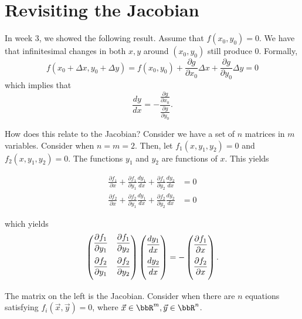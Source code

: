 \documentclass[a4paper, 12pt,oneside,openany]{book}
\begin{document}
\section{Revisiting the Jacobian}

In week 3, we showed the following result. Assume that $f(x_0, y_0)=0$. We have that infinitesimal changes in both $x, y$ around $(x_0, y_0)$ still produce 0. Formally, $$f(x_0 + \Delta x, y_0+\Delta y) = f(x_0, y_0) + \frac{\partial g}{\partial x_0} \Delta x + \frac{\partial g}{\partial y_0} \Delta y = 0$$ which implies that $$\frac{dy}{dx}= -\frac{\frac{\partial g}{\partial x_0}}{\frac{\partial g}{\partial y_0}}.$$

How does this relate to the Jacobian? Consider we have a set of $n$ matrices in $m$ variables. Consider when $n=m=2$. Then, let $f_1(x, y_1, y_2)=0$ and $f_2(x, y_1, y_2)=0$. The functions $y_1$ and $y_2$ are functions of $x$. This yields 

\begin{align*}
	\frac{\partial f_1}{\partial x}+ \frac{\partial f_1}{\partial y_1} \frac{dy_1}{dx}+ \frac{\partial f_1}{\partial y_2} \frac{dy_2}{dx}&=0\\
	\frac{\partial f_2}{\partial x}+ \frac{\partial f_2}{\partial y_1} \frac{dy_1}{dx}+ \frac{\partial f_2}{\partial y_2} \frac{dy_2}{dx}&=0
\end{align*}

which yields $$\begin{pmatrix} \medskip \dfrac{\partial f_1}{\partial y_1} & \dfrac{\partial f_1}{\partial y_2} \\ \medskip \dfrac{\partial f_2}{\partial y_1} & \dfrac{\partial f_2}{\partial y_2} \end{pmatrix} \begin{pmatrix} \medskip \dfrac{dy_1}{dx} \\ \medskip \dfrac{dy_2}{dx} \end{pmatrix} = -\begin{pmatrix} \medskip \dfrac{\partial f_1}{\partial x} \\ \medskip \dfrac{\partial f_2}{\partial x} \end{pmatrix}.$$

The matrix on the left is the Jacobian. Consider when there are $n$ equations satisfying $f_i(\vec{x}, \vec{y})=0$, where $\vec{x} \in \bbR^m, \vec{y} \in \bbR^n$.
\end{document}
